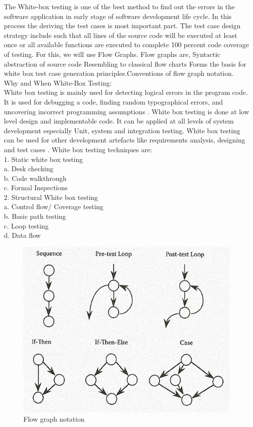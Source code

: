 \documentclass[10pt,a4paper]{article}
\begin{document}
The White-box testing is one of the best method to find out the errors in the software application in early stage of software development life cycle. In this process the deriving the test cases is most important part. The test case design strategy include such that all lines of the source code will be executed at least once or all available functions are executed to complete 100 percent  code coverage of testing. For this, we will use Flow Graphs. Flow graphs are, Syntactic abstraction of source code Resembling to classical flow charts Forms the basis for white box test case generation principles.Conventions of flow graph notation. \\
Why and When White-Box Testing:\\
White box testing is mainly used for detecting logical errors in the program code. It is used for
debugging a code, finding random typographical errors, and uncovering incorrect programming
assumptions .
White box testing is done at low level design and implementable code. It can be applied at all levels of
system development especially Unit, system and integration testing. White box testing can be used for
other development artefacts like requirements analysis, designing and test cases .
White box testing techniques are:\\
1. Static white box testing\\
a. Desk checking\\
b. Code walkthrough\\
c. Formal Inspections\\
2. Structural White box testing\\
a. Control flow/ Coverage testing\\
b. Basic path testing\\
c. Loop testing\\
d. Data flow \\

	\begin{figure}[h!]
		\centering
		\includegraphics[scale=0.45]{CFG.png}
		\caption{Flow graph notation}
	\end{figure}
\end{document}
